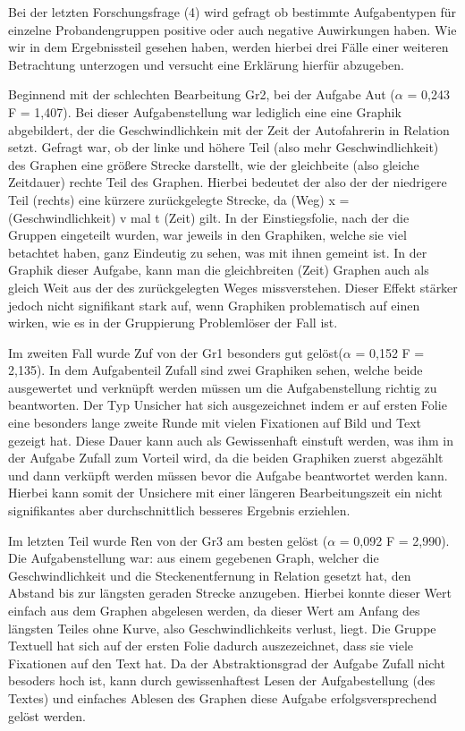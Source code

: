 Bei der letzten Forschungsfrage (4) wird gefragt ob bestimmte Aufgabentypen für einzelne Probandengruppen positive oder auch negative Auwirkungen haben. Wie wir in dem Ergebnissteil gesehen haben, werden hierbei drei Fälle einer weiteren Betrachtung unterzogen und versucht eine Erklärung hierfür abzugeben. 

Beginnend mit der schlechten Bearbeitung \gls{Gr2}, bei der Aufgabe \gls{Aut} ($\alpha$ = 0,243 F = 1,407).  Bei dieser Aufgabenstellung war lediglich eine eine Graphik abgebildert, der die Geschwindlichkein mit der Zeit der Autofahrerin in Relation setzt. Gefragt war, ob der linke und höhere Teil (also mehr Geschwindlichkeit)  des Graphen eine größere Strecke darstellt, wie der gleichbeite (also gleiche Zeitdauer) rechte Teil des Graphen.  Hierbei bedeutet der also der der niedrigere Teil (rechts) eine kürzere zurückgelegte Strecke, da  (Weg) x = (Geschwindlichkeit)  v mal t (Zeit) gilt. In der Einstiegsfolie, nach der die Gruppen eingeteilt wurden, war jeweils in den Graphiken, welche sie viel betachtet haben, ganz Eindeutig zu sehen, was mit ihnen gemeint ist. In der Graphik dieser Aufgabe, kann man die gleichbreiten (Zeit) Graphen auch als gleich Weit aus der des zurückgelegten Weges missverstehen. Dieser Effekt stärker jedoch nicht signifikant stark auf, wenn Graphiken problematisch auf einen wirken, wie es in der Gruppierung Problemlöser der Fall ist.

Im zweiten Fall wurde \gls{Zuf} von der \gls{Gr1} besonders gut gelöst($\alpha$ = 0,152 F = 2,135). In dem Aufgabenteil Zufall sind zwei Graphiken sehen, welche beide ausgewertet und verknüpft werden müssen um die Aufgabenstellung richtig zu beantworten. Der Typ Unsicher hat sich ausgezeichnet indem er auf ersten Folie eine besonders lange zweite Runde mit vielen Fixationen auf Bild und Text gezeigt hat. Diese Dauer kann auch als Gewissenhaft einstuft werden, was ihm in der Aufgabe Zufall zum Vorteil wird, da die beiden Graphiken zuerst abgezählt und dann verküpft werden müssen bevor die Aufgabe beantwortet werden kann. Hierbei kann somit der Unsichere mit einer längeren Bearbeitungszeit ein nicht signifikantes aber durchschnittlich besseres Ergebnis erziehlen. 

Im letzten Teil wurde \gls{Ren} von der \gls{Gr3} am besten gelöst ($\alpha$ = 0,092 F = 2,990). Die Aufgabenstellung war: aus einem gegebenen Graph, welcher die Geschwindlichkeit und die Steckenentfernung in Relation gesetzt hat, den Abstand bis zur längsten geraden Strecke anzugeben. Hierbei konnte dieser Wert einfach aus dem Graphen abgelesen werden, da dieser Wert am Anfang des längsten Teiles ohne Kurve, also Geschwindlichkeits verlust, liegt. Die Gruppe Textuell hat sich auf der ersten Folie dadurch auszezeichnet, dass sie viele Fixationen auf den Text hat. Da der Abstraktionsgrad der Aufgabe Zufall nicht besoders hoch ist, kann durch gewissenhaftest Lesen der Aufgabestellung (des Textes) und einfaches Ablesen des Graphen diese Aufgabe erfolgsversprechend gelöst werden. 

